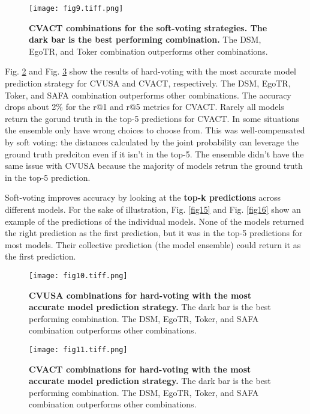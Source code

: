\documentclass[10pt,letterpaper]{article}
\newif\ifhighlight
\newcommand{\hlb}[1]{\ifhighlight{\hl{#1}}\else{#1}\fi}
\begin{document}
\begin{figure}[!ht]
  \caption{{\bf CVACT combinations for the soft-voting strategies. The dark bar is the best performing combination.} The DSM, EgoTR, and Toker combination outperforms other combinations. }
  \texttt{[image: fig9.tiff.png]}
  
  \label{fig9}
\end{figure}

\hlb{Fig.} \ref{fig10} and \hlb{Fig.} \ref{fig11} show the results of hard-voting with the most accurate model prediction strategy for CVUSA and CVACT, respectively. \hlb{The DSM, EgoTR, Toker, and SAFA combination outperforms other combinations.}
\hlb{The accuracy drops about 2\% for the r@1 and r@5 metrics for CVACT. Rarely all models return the gorund truth in the top-5 predictions for CVACT. In some situations the ensemble only have wrong choices to choose from. This was well-compensated by soft voting: the distances calculated by the joint probability can leverage the ground truth predciton even if it isn't in the top-5. The ensemble didn't have the same issue with CVUSA because the majority of models retrun the ground truth in the top-5 prediction.}

\hlb{Soft-voting improves accuracy by looking at the }{\bf \hlb{top-k predictions}} \hlb{across different models. For the sake of illustration, Fig. }\ref{fig15} \hlb{and Fig. } \ref{fig16} \hlb{show an example of the predictions of the individual models. None of the models returned the right prediction as the first prediction, but it was in the top-5 predictions for most models. Their collective prediction (the model ensemble) could return it as the first prediction.}

\begin{figure}[!ht]
  \caption{{\bf CVUSA combinations for hard-voting with the most accurate model prediction strategy.} The dark bar is the best performing combination. The DSM, EgoTR, Toker, and SAFA combination outperforms other combinations.}
  \texttt{[image: fig10.tiff.png]}
  \label{fig10}
\end{figure}

\begin{figure}[!ht]
  \caption{{\bf CVACT combinations for hard-voting with the most accurate  model prediction strategy.} The dark bar is the best performing combination. The DSM, EgoTR, Toker, and SAFA combination outperforms other combinations.}
  \texttt{[image: fig11.tiff.png]}
  \label{fig11}
\end{figure}
\end{document}
